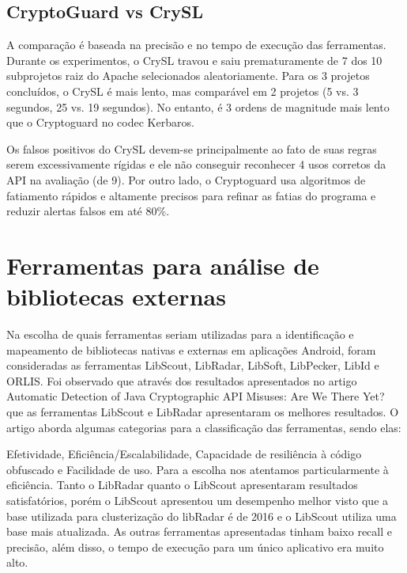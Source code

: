 \subsection{CryptoGuard vs CrySL} %

A comparação é baseada na precisão e no tempo de execução das ferramentas. Durante os experimentos, o CrySL travou e saiu prematuramente de 7 dos 10 subprojetos raiz do Apache selecionados aleatoriamente. Para os 3 projetos concluídos, o CrySL é mais lento, mas comparável em 2 projetos (5 vs. 3 segundos, 25 vs. 19 segundos). No entanto, é 3 ordens de magnitude mais lento que o Cryptoguard no codec Kerbaros. 

Os falsos positivos do CrySL devem-se principalmente ao fato de suas regras serem excessivamente rígidas e ele não conseguir reconhecer 4 usos corretos da API na avaliação (de 9). Por outro lado, o Cryptoguard usa algoritmos de fatiamento rápidos e altamente precisos para refinar as fatias do programa e reduzir alertas falsos em até 80\%. 

\section{Ferramentas para análise de bibliotecas externas} %

Na escolha de quais ferramentas seriam utilizadas para a identificação e mapeamento de bibliotecas nativas e externas em aplicações Android, foram consideradas as ferramentas LibScout, LibRadar, LibSoft, LibPecker, LibId e ORLIS. Foi observado que através dos resultados apresentados no artigo Automatic Detection of Java Cryptographic API Misuses: Are We There Yet? que as ferramentas LibScout e LibRadar apresentaram os melhores resultados. O artigo aborda algumas categorias para a classificação das ferramentas, sendo elas:

Efetividade, Eficiência/Escalabilidade, Capacidade de resiliência à código obfuscado e Facilidade de uso. Para a escolha nos atentamos particularmente à eficiência. Tanto o LibRadar quanto o LibScout apresentaram resultados satisfatórios, porém o LibScout apresentou um desempenho melhor visto que a base utilizada para clusterização do libRadar é de 2016 e o LibScout utiliza uma base mais atualizada. As outras ferramentas apresentadas tinham baixo recall e precisão, além disso, o tempo de execução para um único aplicativo era muito alto.

